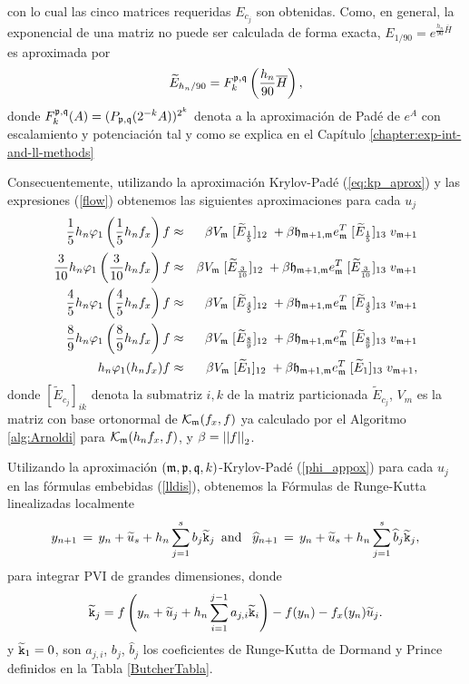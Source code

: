 con lo cual las cinco matrices requeridas $E_{c_j}$ son obtenidas. Como, en general, la exponencial de una matriz no puede ser calculada de forma exacta, $E_{1/90}=e^{\frac{h_n}{90}\overline{H}}$ es aproximada por 
\[\widetilde{E}_{h_n/90} = F_k^{\mathfrak{p},\mathfrak{q}}\left(\frac{h_n}{90}\overline{H}\right), \]
donde $F_k^{\mathfrak{p},\mathfrak{q}}(A)=(P_{\mathfrak{p},\mathfrak{q}}(2^{-k}A))^{2^k}$ denota a la aproximación de Padé de $e^A$ con escalamiento y potenciación tal y como se explica en el Capítulo \ref{chapter:exp-int-and-ll-methods}

Consecuentemente, utilizando la aproximación Krylov-Padé (\ref{eq:kp_aprox}) y las expresiones (\ref{flow}) obtenemos las siguientes aproximaciones para cada $u_j$
\begin{eqnarray}
    \frac{1}{5}h_n\varphi_1\left(\frac{1}{5}h_n f_x\right)f & \approx & \beta   V_{\mathfrak{m}}\; [\widetilde{E}_{\frac{1}{5}}]_{12}\;  + \beta \mathfrak{h}_{\mathfrak{m}+1,\mathfrak{m}}e_{\mathfrak{m}}^T\; [\widetilde{E}_{\frac{1}{5}}]_{13}\;  v_{\mathfrak{m}+1} \notag \\
    \frac{3}{10}h_n\varphi_1\left(\frac{3}{10}h_n f_x\right)f & \approx & \beta   V_{\mathfrak{m}}\; [\widetilde{E}_{\frac{3}{10}}]_{12}\;  + \beta \mathfrak{h}_{\mathfrak{m}+1,\mathfrak{m}}e_{\mathfrak{m}}^T\; [\widetilde{E}_{\frac{3}{10}}]_{13}\;  v_{\mathfrak{m}+1} \notag \\
    \frac{4}{5}h_n\varphi_1\left(\frac{4}{5}h_n f_x\right)f & \approx & \beta   V_{\mathfrak{m}}\; [\widetilde{E}_{\frac{4}{5}}]_{12}\;  + \beta \mathfrak{h}_{\mathfrak{m}+1,\mathfrak{m}}e_{\mathfrak{m}}^T\; [\widetilde{E}_{\frac{4}{5}}]_{13}\;  v_{\mathfrak{m}+1} \label{phi_appox} \\
    \frac{8}{9}h_n\varphi_1\left(\frac{8}{9}h_n f_x\right)f & \approx & \beta   V_{\mathfrak{m}}\; [\widetilde{E}_{\frac{8}{9}}]_{12}\;  + \beta \mathfrak{h}_{\mathfrak{m}+1,\mathfrak{m}}e_{\mathfrak{m}}^T\; [\widetilde{E}_{\frac{8}{9}}]_{13}\;  v_{\mathfrak{m}+1} \notag \\
    h_n\varphi_1(h_n f_x)f & \approx &  \beta V_{\mathfrak{m}}\; [\widetilde{E}_1]_{12}\;  + \beta\mathfrak{h}_{\mathfrak{m}+1,\mathfrak{m}}e_{\mathfrak{m}}^T\; [\widetilde{E}_1]_{13}\;  v_{\mathfrak{m}+1}, \notag
\end{eqnarray}
donde $[\widetilde{E}_{c_j}]_{ik}$ denota la submatriz $i,k$ de la matriz particionada $\widetilde{E}_{c_j}$, $V_m$ es la matriz con base ortonormal de $\mathcal{K}_ {\mathfrak{m}}(f_x,f)$ ya calculado por el Algoritmo \ref{alg:Arnoldi} para $\mathcal{K}_{\mathfrak{m}}(h_nf_x,f)$, y $\beta=\left\lvert \left\lvert f \right\rvert  \right\rvert_2$.

Utilizando la aproximación $(\mathfrak{m} , \mathfrak{p} ,\mathfrak{q} , k)$-Krylov-Padé (\ref{phi_appox}) para cada $u_j$ en las fórmulas embebidas (\ref{lldis}), obtenemos la Fórmulas de Runge-Kutta linealizadas localmente
\begin{equation}  \label{LLDPK scheme}
    y_{n+1}\,=\,y_n+\widetilde{u}_s+h_n \sum_{j=1}^{s}b_j \widetilde{\mathtt{k}}_j \,\,\, \text{and} \,\,\, \
    \widehat{y}_{n+1}\,=\, y_n+\widetilde{u}_s+h_n \sum_{j=1}^{s}\widehat{b}_j \widetilde{\mathtt{k}}_j,
\end{equation}
para integrar PVI de grandes dimensiones, donde
\begin{equation*}
    \widetilde{\mathtt{k}}_j = f\left( y_n+\widetilde{u}_j+h_n \sum_{i=1}^{j-1}a_{j,i}\widetilde{\mathtt{k}}_i \right) - f( y_n) - f_x(y_n)\widetilde{u}_j.
\end{equation*}
y $\widetilde{\mathtt{k}}_1=0$, son $a_{j,i}$, $b_j$, $\widehat{b}_j$ los coeficientes de Runge-Kutta de  Dormand y Prince definidos en la Tabla \ref{ButcherTabla}.


